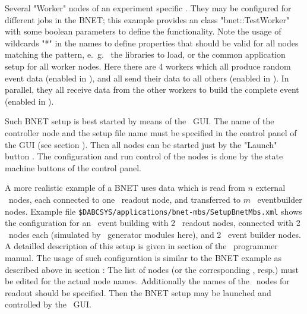 \item Several "Worker" nodes of an experiment specific . They
may be configured for different jobs in the BNET; this example provides
an  class "bnet::TestWorker" with some boolean parameters
to define the functionality.
\ebul 
Note the usage of wildcards "*" in the  names to define
properties that should be valid for all nodes matching the pattern, e.~g.~
the libraries to load, or the common application setup for all worker nodes.
Here there are 4 workers which all produce random event data (enabled in ),
and all send their data to all others (enabled in ). In parallel,
they all receive data from the other workers to build the complete event
(enabled in ).

Such BNET setup is best started by means of the \dabc\ GUI.
The name of the controller  node and
the setup file name must be specified in the control panel of the GUI
(see section ). Then all nodes can be started just by the
"Launch" button . The configuration and run control of the nodes is done by the state machine buttons of the control panel.


A more realistic example of a BNET uses data which is read from $n$ external \mbs\ 
nodes, each connected to one \dabc\ readout node, and transferred to
$m$ \dabc\ eventbuilder nodes.
Example file {\tt \$DABCSYS/applications/bnet-mbs/SetupBnetMbs.xml}
shows the configuration for an \mbs\  event building with 2 \dabc\ readout nodes, connected with 2 \mbs\ nodes each (simulated by \dabc\ generator modules here),
and 2 \dabc\ event builder nodes. A detailled description
of this setup is given in section  of the \dabc\
programmer manual.
The usage of such configuration is similar to the BNET example as
described above in section :
The list of \keyw{<Context>} nodes (or the
corresponding \keyw{<Variables>}, resp.) 
must be edited for the actual node names. Additionally the names of the
\mbs\ nodes for readout should be specified. Then the BNET
setup may be launched and controlled by the \dabc\ GUI.







